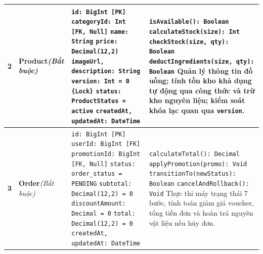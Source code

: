 \documentclass[12pt,a4paper]{article}
\begin{document}
\begin{xltabular}{\textwidth}{|c|>{\raggedright\arraybackslash}p{3.2cm}|>{\raggedright\arraybackslash}p{4.2cm}|>{\raggedright\arraybackslash}X|}
\textbf{2} & \textbf{Product}\newline\textit{(Bắt buộc)} & 
\texttt{id: BigInt [PK]}\newline
\texttt{categoryId: Int [FK, Null]}\newline
\texttt{name: String}\newline
\texttt{price: Decimal(12,2)}\newline
\texttt{imageUrl, description: String}\newline
\texttt{version: Int = 0 \{Lock\}}\newline
\texttt{status: ProductStatus = active}\newline
\texttt{createdAt, updatedAt: DateTime} & 
\texttt{isAvailable(): Boolean}\newline
\texttt{calculateStock(size): Int}\newline
\texttt{checkStock(size, qty): Boolean}\newline
\texttt{deductIngredients(size, qty): Boolean}\newline
Quản lý thông tin đồ uống; tính tồn kho khả dụng tự động qua công thức và trừ kho nguyên liệu; kiểm soát khóa lạc quan qua \texttt{version}. \\
\hline

\textbf{3} & \textbf{Order}\newline\textit{(Bắt buộc)} & 
\texttt{id: BigInt [PK]}\newline
\texttt{userId: BigInt [FK]}\newline
\texttt{promotionId: BigInt [FK, Null]}\newline
\texttt{status: order\_status = PENDING}\newline
\texttt{subtotal: Decimal(12,2) = 0}\newline
\texttt{discountAmount: Decimal = 0}\newline
\texttt{total: Decimal(12,2) = 0}\newline
\texttt{createdAt, updatedAt: DateTime} & 
\texttt{calculateTotal(): Decimal}\newline
\texttt{applyPromotion(promo): Void}\newline
\texttt{transitionTo(newStatus): Boolean}\newline
\texttt{cancelAndRollback(): Void}\newline
Thực thi máy trạng thái 7 bước, tính toán giảm giá voucher, tổng tiền đơn và hoàn trả nguyên vật liệu nếu hủy đơn. \\
\hline


\end{xltabular}
\end{document}
